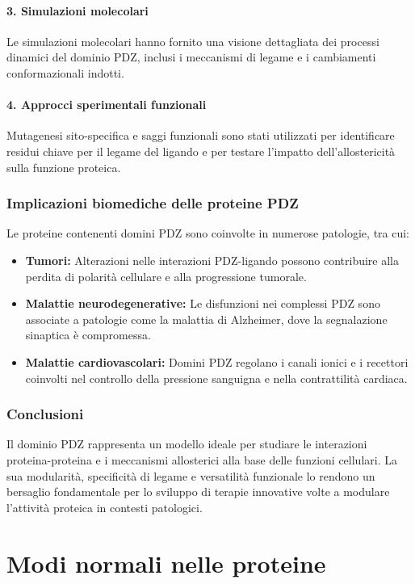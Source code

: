 \documentclass[Lau,binding=0.6cm,oneside,noexaminfo]{sapthesis}
\begin{document}
\subsubsection*{3. Simulazioni molecolari}
Le simulazioni molecolari hanno fornito una visione dettagliata dei processi dinamici del dominio PDZ, inclusi i meccanismi di legame e i cambiamenti conformazionali indotti.

\subsubsection*{4. Approcci sperimentali funzionali}
Mutagenesi sito-specifica e saggi funzionali sono stati utilizzati per identificare residui chiave per il legame del ligando e per testare l’impatto dell’allostericità sulla funzione proteica.

\subsection*{Implicazioni biomediche delle proteine PDZ}

Le proteine contenenti domini PDZ sono coinvolte in numerose patologie, tra cui:
\begin{itemize}
    \item \textbf{Tumori:} Alterazioni nelle interazioni PDZ-ligando possono contribuire alla perdita di polarità cellulare e alla progressione tumorale.
    \item \textbf{Malattie neurodegenerative:} Le disfunzioni nei complessi PDZ sono associate a patologie come la malattia di Alzheimer, dove la segnalazione sinaptica è compromessa.
    \item \textbf{Malattie cardiovascolari:} Domini PDZ regolano i canali ionici e i recettori coinvolti nel controllo della pressione sanguigna e nella contrattilità cardiaca.
\end{itemize}

\subsection*{Conclusioni}

Il dominio PDZ rappresenta un modello ideale per studiare le interazioni proteina-proteina e i meccanismi allosterici alla base delle funzioni cellulari. La sua modularità, specificità di legame e versatilità funzionale lo rendono un bersaglio fondamentale per lo sviluppo di terapie innovative volte a modulare l’attività proteica in contesti patologici.
\chapter{Modi normali nelle proteine}
\end{document}
